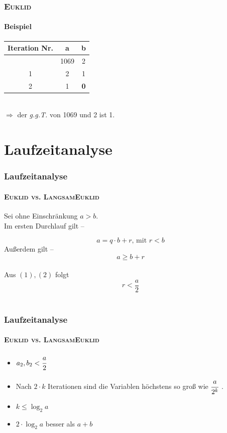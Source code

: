 \documentclass[•]{beamer}
\begin{document}
\begin{frame}
\frametitle{\textsc{Euklid}}
\framesubtitle{Beispiel}
\pause
\begin{tabular}{|c|c|c|} \hline
	Iteration Nr.& a & b \\ \hline
	& 1069 & 2  \\
	1\pause & 2 & 1 \\
	2\pause & 1 & \textbf{0} \\ \hline
	\end{tabular}\\ \vspace{5pt}
	$\Rightarrow$ der \textit{g.g.T.} von 1069 und 2 ist 1.

\end{frame}

\section{Laufzeitanalyse}

\begin{frame}
	\frametitle{Laufzeitanalyse}
	\framesubtitle{\textsc{Euklid vs. LangsamEuklid}}
	Sei ohne Einschr\"ankung $a>b$.\pause \\ Im ersten Durchlauf gilt --
	
	\begin{equation}a = q \cdot b + r \text{, mit } r < b
	\end{equation}
	\pause 
	 Au{\ss}erdem gilt -- \\ \begin{equation}a \geq b + r \end{equation} \\
	 \pause 
	 Aus $(1), (2)$ folgt $$r < \frac{a}{2}$$ \\
\end{frame}	
\begin{frame}
	\frametitle{Laufzeitanalyse}
	\framesubtitle{\textsc{Euklid vs. LangsamEuklid}}
	\begin{itemize}
	\item $a_{2}, b_{2} < \cfrac{a}{2}$ \vspace*{10pt}
	\pause 
	\item Nach $2 \cdot k$ Iterationen sind die Variablen h\"ochstens so gro{\ss} wie $\cfrac{a}{2^k}$ \vspace{15pt} .	
	\pause 
	\item $k \leq \log_{2}a$
	\pause 
	\item $2\cdot \log_{2}a$ besser als $a+b$
	\end{itemize}
\end{frame}
\end{document}
